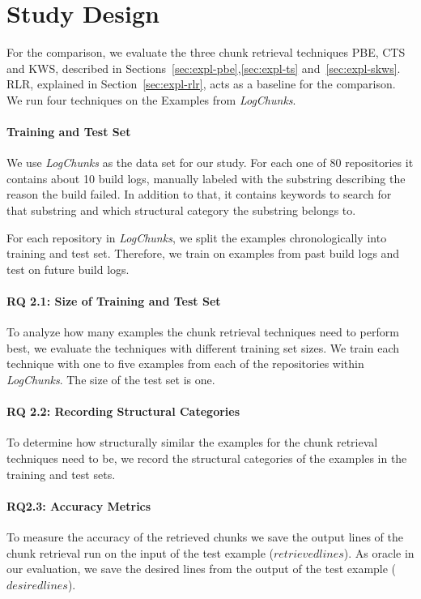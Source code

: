 \documentclass[\myrootdir/main.tex]{subfiles}
\begin{document}
\section{Study Design}
For the comparison, we evaluate the three chunk retrieval techniques PBE, CTS and KWS, described in Sections~\ref{sec:expl-pbe},\ref{sec:expl-ts} and~\ref{sec:expl-skws}.
RLR, explained in Section~\ref{sec:expl-rlr}, acts as a baseline for the comparison.
We run four techniques on the Examples from \emph{LogChunks}.
\paragraph{Training and Test Set}
We use \emph{LogChunks} as the data set for our study.
For each one of 80 repositories it contains about 10 build logs, manually labeled with the substring describing the reason the build failed.
In addition to that, it contains keywords to search for that substring and which structural category the substring belongs to.

For each repository in \emph{LogChunks}, we split the examples chronologically into training and test set.
Therefore, we train on examples from past build logs and test on future build logs.
\paragraph{RQ 2.1: Size of Training and Test Set}
To analyze how many examples the chunk retrieval techniques need to perform best, we evaluate the techniques with different training set sizes.
We train each technique with one to five examples from each of the repositories within \emph{LogChunks}.
The size of the test set is one.
\paragraph{RQ 2.2: Recording Structural Categories}
To determine how structurally similar the examples for the chunk retrieval techniques need to be, we record the structural categories of the examples in the training and test sets.
\paragraph{RQ2.3: Accuracy Metrics}
To measure the accuracy of the retrieved chunks we save the output lines of the chunk retrieval run on the input of the test example ($retrievedlines$).
As oracle in our evaluation, we save the desired lines from the output of the test example ($desiredlines$).
\end{document}
